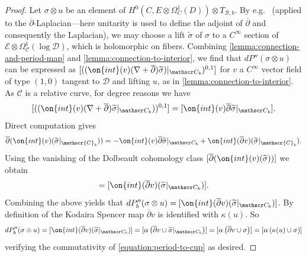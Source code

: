 \begin{proof}
Let $\sigma\otimes u$ be an element of $H^0( C, E \otimes \Omega^1_{ C}(D)) \otimes
			T_{\mathscr B,b}$. By e.g.~\cite[Proposition
			9.22]{Voisin:hodgeTheory} (applied to the
			$\overline\partial$-Laplacian---here unitarity is used
		to define the adjoint of $\overline\partial$ and consequently
	the Laplacian), we may choose a lift $\widetilde\sigma$ of $\sigma$ to a $C^\infty$ section of $\mathscr{E}\otimes \Omega^1_{\mathscr{C}}(\log \mathscr{D})$, which is holomorphic on fibers.
	Combining \autoref{lemma:connection-and-period-map} and
	\autoref{lemma:connection-to-interior}, we find that $dP''(\sigma
	\otimes u)$
	can be expressed as $[((\on{int}(v)(\nabla+\overline{\partial})\widetilde{\sigma})|_{\mathscr C_b})^{0,1}]$ for
$v$ a $C^\infty$ vector field of type $(1,0)$ tangent to $\mathscr{D}$ and lifting $u$, as in \autoref{lemma:connection-to-interior}.
As $\mathscr{C}$ is a relative curve, for degree reasons we have
$$[((\on{int}(v)(\nabla+\overline{\partial})\widetilde{\sigma}|_{\mathscr C_b}))^{0,1}]=[\on{int}(v)\overline{\partial}\widetilde{\sigma}|_{\mathscr C_b}].$$
Direct computation gives
\begin{align*}
	\overline{\partial} (\on{int}(v) (\widetilde{\sigma}|_{\mathscr{C}_b})) =
	- \on{int}(v)\overline{\partial}\widetilde{\sigma}|_{\mathscr C_b}
	+ \on{int}(\overline{\partial} v)(\widetilde{\sigma}|_{\mathscr{C}_b}).
\end{align*}
Using the vanishing of
the Dolbeault cohomology class $[\overline{\partial} (\on{int}(v)
(\widetilde{\sigma}))]$
we obtain
\begin{align*}
	[\on{int}(v)(\overline{\partial}\widetilde{\sigma}|_{\mathscr C_b})]
	=
	[\on{int}(\overline{\partial}v)(\widetilde{\sigma}|_{\mathscr C_b})].
\end{align*}
Combining the above yields that $dP''_b(\sigma\otimes u) =
[\on{int}(\overline{\partial}v)(\widetilde{\sigma}|_{\mathscr C_b})]$.
By definition of the Kodaira Spencer map
$\overline{\partial}v$ is identified with $\kappa(u)$.
So
\begin{align*}
dP''_b(\sigma \otimes u) =
[\on{int}(\overline{\partial}v)(\widetilde{\sigma}|_{\mathscr C_b})]
=
[\alpha\left( \overline{\partial}v \cup \widetilde{\sigma}|_{\mathscr C_b}\right)]
=
[\alpha\left( \overline{\partial}v\cup \sigma \right)]
=
[\alpha\left( \kappa(u) \cup \sigma \right)]
\end{align*}
verifying the commutativity of
\eqref{equation:period-to-cup} as desired.
\end{proof}

